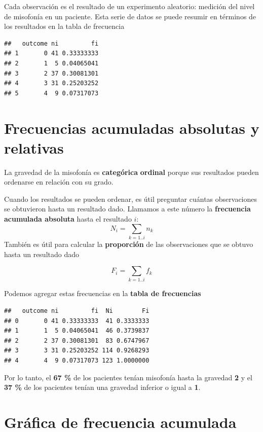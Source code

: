 \documentclass[
]{book}
\begin{document}
Cada observación es el resultado de un experimento aleatorio: medición del nivel de misofonía en un paciente. Esta serie de datos se puede resumir en términos de los resultados en la tabla de frecuencia

\begin{verbatim}
##   outcome ni         fi
## 1       0 41 0.33333333
## 2       1  5 0.04065041
## 3       2 37 0.30081301
## 4       3 31 0.25203252
## 5       4  9 0.07317073
\end{verbatim}

\hypertarget{frecuencias-acumuladas-absolutas-y-relativas}{%
\section{Frecuencias acumuladas absolutas y relativas}\label{frecuencias-acumuladas-absolutas-y-relativas}}

La gravedad de la misofonía es \textbf{categórica} \textbf{ordinal} porque sus resultados pueden ordenarse en relación con su grado.

Cuando los resultados se pueden ordenar, es útil preguntar cuántas observaciones se obtuvieron hasta un resultado dado. Llamamos a este número la \textbf{frecuencia acumulada absoluta} hasta el resultado \(i\):
\[N_i=\sum_{k=1..i} n_k\]
También es útil para calcular la \textbf{proporción} de las observaciones que se obtuvo hasta un resultado dado

\[F_i=\sum_{k=1..i} f_k\]

Podemos agregar estas frecuencias en la \textbf{tabla de frecuencias}

\begin{verbatim}
##   outcome ni         fi  Ni        Fi
## 0       0 41 0.33333333  41 0.3333333
## 1       1  5 0.04065041  46 0.3739837
## 2       2 37 0.30081301  83 0.6747967
## 3       3 31 0.25203252 114 0.9268293
## 4       4  9 0.07317073 123 1.0000000
\end{verbatim}

Por lo tanto, el \textbf{67 \%} de los pacientes tenían misofonía hasta la gravedad \textbf{2} y el \textbf{37 \%} de los pacientes tenían una gravedad inferior o igual a \textbf{1}.

\hypertarget{gruxe1fica-de-frecuencia-acumulada}{%
\section{Gráfica de frecuencia acumulada}\label{gruxe1fica-de-frecuencia-acumulada}}
\end{document}
